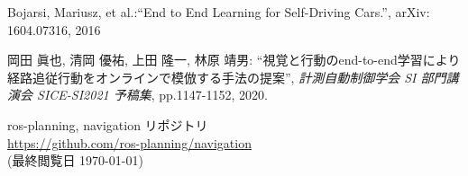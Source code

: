 \documentclass[10pt]{ujarticle}
\begin{document}
    \vspace{5truemm}
    {\footnotesize
        \begin{thebibliography}{99}

            Bojarsi, Mariusz, et al.:``End to End Learning for Self-Driving Cars.'', arXiv: 1604.07316, 2016
            
            岡田 眞也, 清岡 優祐, 上田 隆一, 林原 靖男: ``視覚と行動のend-to-end学習により経路追従行動をオンラインで模倣する手法の提案'', \textit{計測自動制御学会 SI 部門講演会 SICE-SI2021 予稿集}, pp.1147-1152, 2020.



            ros-planning, navigation リポジトリ\\
            \url{https://github.com/ros-planning/navigation}\\
            (最終閲覧日 \today)



            
        \end{thebibliography}
    }
\end{document}
